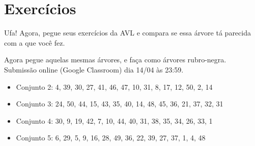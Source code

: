 \section*{Exercícios}
\begin{frame}[fragile]


Ufa! Agora, pegue seus exercícios da AVL e compara se essa árvore tá parecida com a que você fez.


Agora pegue aquelas mesmas árvores, e faça como árvores rubro-negra. Submissão online (Google Classroom) dia 14/04 às 23:59.

\begin{itemize}
  \item Conjunto 2: 4, 39, 30, 27, 41, 46, 47, 10, 31, 8, 17, 12, 50, 2, 14
  \item Conjunto 3: 24, 50, 44, 15, 43, 35, 40, 14, 48, 45, 36, 21, 37, 32, 31
  \item Conjunto 4: 30, 9, 19, 42, 7, 10, 44, 40, 31, 38, 35, 34, 26, 33, 1
  \item Conjunto 5: 6, 29, 5, 9, 16, 28, 49, 36, 22, 39, 27, 37, 1, 4, 48
\end{itemize}
\end{frame}